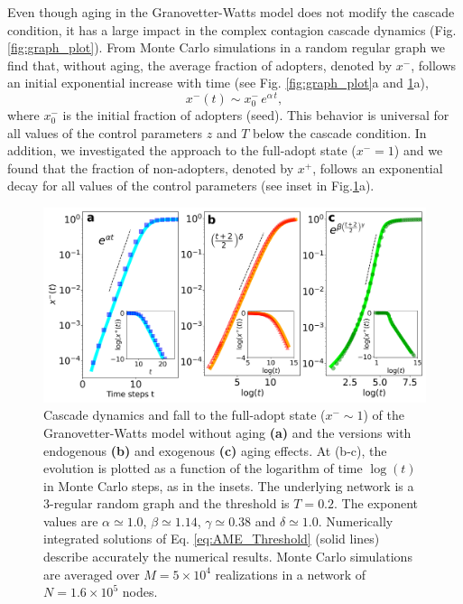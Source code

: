 Even though aging in the Granovetter-Watts model does not modify the cascade condition, it has a large impact in the complex contagion cascade dynamics (Fig.\ref{fig:graph_plot}). 
From Monte Carlo simulations in a random regular graph we find that, without aging,  the average fraction of adopters, denoted by $x^{-}$, follows an initial exponential increase with time (see Fig. \ref{fig:graph_plot}a and \ref{fig:models}a), 
\begin{equation}
x^{-}(t) \sim x^{-}_{0} \, e^{\alpha \, t},
\label{eq:exponential}
\end{equation}
where $x^{-}_{0}$ is the initial fraction of adopters (seed). This behavior is universal for all values of the control parameters $z$ and $T$ below the cascade condition. In addition, we investigated the approach to the full-adopt state ($x^{-} = 1$) and we found that the fraction of non-adopters, denoted by $x^{+}$, follows an exponential decay for all values of the control parameters (see inset in Fig.\ref{fig:models}a).

\begin{figure}
\centering \captionsetup{font=sf}
\includegraphics[width=0.7\columnwidth]{Figs/Aging_Threshold/EVO_MOD.pdf}
\caption[Cascade dynamics and fall to the full-adopt state ($x^{-} \sim 1$)]{\label{fig:models} Cascade dynamics and fall to the full-adopt state ($x^{-} \sim 1$) of the Granovetter-Watts model without aging \textbf{(a)} and the versions with endogenous \textbf{(b)} and exogenous \textbf{(c)} aging effects. At (b-c), the evolution is plotted as a function of the logarithm of time $\log{(t)}$ in Monte Carlo steps, as in the insets. The underlying network is a 3-regular random graph and the threshold is $T = 0.2$. The exponent values are $\alpha \simeq 1.0$, $\beta \simeq 1.14$, $\gamma \simeq 0.38$ and $\delta \simeq 1.0$. Numerically integrated solutions of Eq. \eqref{eq:AME_Threshold} (solid lines) describe accurately the numerical results. Monte Carlo simulations are averaged over $M = 5 \times 10^4$ realizations in a network of $N = 1.6 \times 10^5$ nodes.}
\end{figure}

